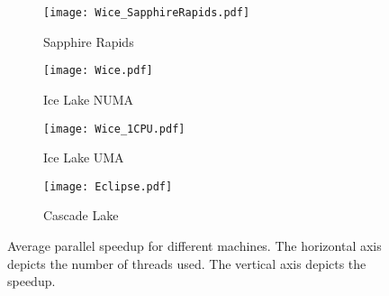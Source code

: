 
\begin{figure}
    \centering
    \begin{subfigure}{0.45\textwidth}
        \texttt{[image: Wice\_SapphireRapids.pdf]}
        \caption{Sapphire Rapids}
    \end{subfigure}
    \hspace{0.05\textwidth}
    \begin{subfigure}{0.45\textwidth}
        \texttt{[image: Wice.pdf]}
        \caption{Ice Lake NUMA}
    \end{subfigure}
    \begin{subfigure}{0.45\textwidth}
        \texttt{[image: Wice\_1CPU.pdf]}
        \caption{Ice Lake UMA}
    \end{subfigure}
    \hspace{0.05\textwidth}
    \begin{subfigure}{0.45\textwidth}
        \texttt{[image: Eclipse.pdf]}
        \caption{Cascade Lake}\label{fig:AvgParSpeedupEclipse}
    \end{subfigure}
    \caption{Average parallel speedup for different machines. The horizontal axis depicts the number of threads used. The vertical axis depicts the speedup.}\label{fig:AvgParSpeedup}
\end{figure}
